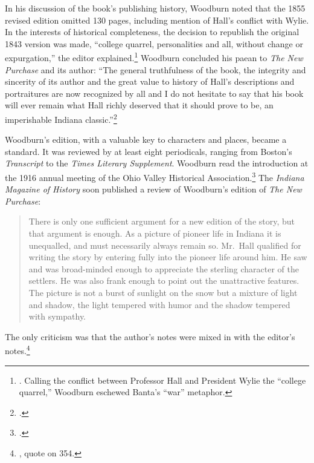 \documentclass[
  american,
  letterpaper,
]{scrreprt}
\begin{document}
In his discussion of the book's publishing history, Woodburn noted that
the 1855 revised edition omitted 130 pages, including mention of Hall's
conflict with Wylie. In the interests of historical completeness, the
decision to republish the original 1843 version was made, ``college
quarrel, personalities and all, without change or expurgation,'' the
editor explained.\footnote{. Calling
  the conflict between Professor Hall and President Wylie the ``college
  quarrel,'' Woodburn eschewed Banta's ``war'' metaphor.} Woodburn
concluded his paean to \emph{The New Purchase} and its author: ``The
general truthfulness of the book, the integrity and sincerity of its
author and the great value to history of Hall's descriptions and
portraitures are now recognized by all and I do not hesitate to say that
his book will ever remain what Hall richly deserved that it should prove
to be, an imperishable Indiana classic.''\footnote{.}

Woodburn's edition, with a valuable key to characters and places, became
a standard. It was reviewed by at least eight periodicals, ranging from
Boston's \emph{Transcript} to the \emph{Times Literary Supplement}.
Woodburn read the introduction at the 1916 annual meeting of the Ohio
Valley Historical Association.\footnote{.} The \emph{Indiana Magazine of History} soon published
a review of Woodburn's edition of \emph{The New Purchase}:

\begin{quote}
There is only one sufficient argument for a new edition of the story,
but that argument is enough. As a picture of pioneer life in Indiana it
is unequalled, and must necessarily always remain so. Mr.~Hall qualified
for writing the story by entering fully into the pioneer life around
him. He saw and was broad-minded enough to appreciate the sterling
character of the settlers. He was also frank enough to point out the
unattractive features. The picture is not a burst of sunlight on the
snow but a mixture of light and shadow, the light tempered with humor
and the shadow tempered with sympathy.
\end{quote}

The only criticism was that the author's notes were mixed in with the
editor's notes.\footnote{, quote on 354.}
\end{document}
